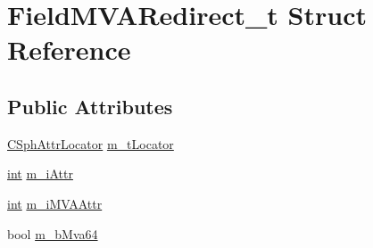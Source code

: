 \hypertarget{structFieldMVARedirect__t}{\section{Field\-M\-V\-A\-Redirect\-\_\-t Struct Reference}
\label{structFieldMVARedirect__t}
}
\subsection*{Public Attributes}
\begin{DoxyCompactItemize}
\item 
\hyperlink{structCSphAttrLocator}{C\-Sph\-Attr\-Locator} \hyperlink{structFieldMVARedirect__t_adfc8cbe536fa8dd1efed1fa5b46f7e07}{m\-\_\-t\-Locator}
\item 
\hyperlink{sphinxexpr_8cpp_a4a26e8f9cb8b736e0c4cbf4d16de985e}{int} \hyperlink{structFieldMVARedirect__t_a80b6f9b763e62c87233b7dcef7e3eda3}{m\-\_\-i\-Attr}
\item 
\hyperlink{sphinxexpr_8cpp_a4a26e8f9cb8b736e0c4cbf4d16de985e}{int} \hyperlink{structFieldMVARedirect__t_a0854c1a3c9fbd6ca08939ddeb3db5325}{m\-\_\-i\-M\-V\-A\-Attr}
\item 
bool \hyperlink{structFieldMVARedirect__t_a239b13ccda58a4bb994d4bf05ffe059e}{m\-\_\-b\-Mva64}
\end{DoxyCompactItemize}


